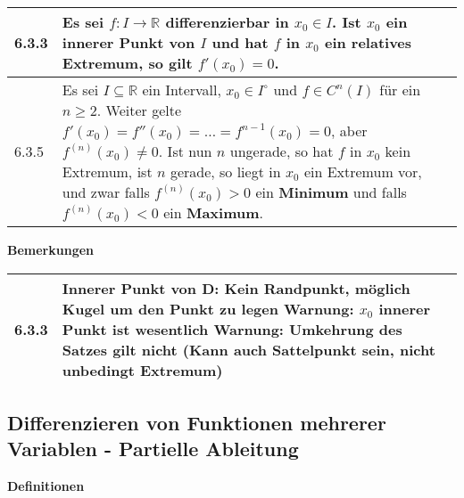     \begin{longtable}{p{1cm} p{16cm}}
        \toprule

        6.3.3 & Es sei $f: I \rightarrow \mathbb{R}$ differenzierbar in $x_0 \in I$. Ist $x_0$ ein innerer Punkt von $I$ und hat $f$ in $x_0$
                ein relatives Extremum, so gilt $f'(x_0) = 0$. \\
        \midrule
        6.3.5 & Es sei $I \subseteq \mathbb{R}$ ein Intervall, $x_0 \in I^{\circ}$ und $f \in C^n(I)$ für ein $n \geq 2$. Weiter gelte
                $f'(x_0) = f''(x_0) = \dots = f^{n-1}(x_0) = 0$, aber $f^{(n)}(x_0) \neq 0$. Ist nun $n$ ungerade, so hat $f$ in $x_0$ kein
                Extremum, ist $n$ gerade, so liegt in $x_0$ ein Extremum vor, und zwar falls $f^{(n)}(x_0) > 0$ ein \textbf{Minimum} und falls
                $f^{(n)}(x_0) < 0$ ein \textbf{Maximum}. \\

        \bottomrule
    \end{longtable}
    

    \noindent
    \textbf{Bemerkungen}
    
    \begin{longtable}{p{1cm} p{16cm}}
        \toprule

        6.3.3 & Innerer Punkt von D: Kein Randpunkt, möglich Kugel um den Punkt zu legen \hfill \break
                Warnung: $x_0$ innerer Punkt ist wesentlich \hfill \break
                Warnung: Umkehrung des Satzes gilt nicht (Kann auch Sattelpunkt sein, nicht unbedingt Extremum) \\

        \bottomrule
    \end{longtable}
    

    

\subsection{Differenzieren von Funktionen mehrerer Variablen - Partielle Ableitung}

    \noindent
    \textbf{Definitionen}
      
